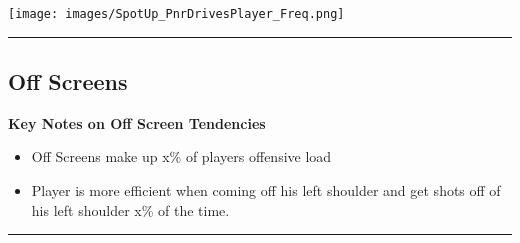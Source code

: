 \documentclass[a4paper,12pt]{article}
\begin{document}
\begin{table}[H]
{\begin{minipage}[t]{0.6\textwidth}
{\begin{tabular}
{{{{{{{{{{{{            \bottomrule
        \end{tabular}
        } %
    \end{minipage}
    } %
    \hfill %
    \begin{minipage}[c]{0.35\textwidth} %
        \flushright
        \texttt{[image: images/SpotUp\_PnrDrivesPlayer\_Freq.png]} %
    \end{minipage}
\end{table}

\vspace{-1em} %
\hrule height 1pt width 1\textwidth %
\vspace{1em} %
\clearpage











\subsection{Off Screens}
\vspace{1.25em} %
\textbf{Key Notes on Off Screen Tendencies}
\vspace{0.5em} %

\begin{itemize}
    \item Off Screens make up x\% of players offensive load
    \vspace{0.3em} %
    \item Player is more efficient when coming off his left shoulder and get shots off of his left shoulder x\% of the time.
\end{itemize}

\vspace{1em} %
\hrule height 1pt width 1\textwidth %
\vspace{0em} %
\end{document}
